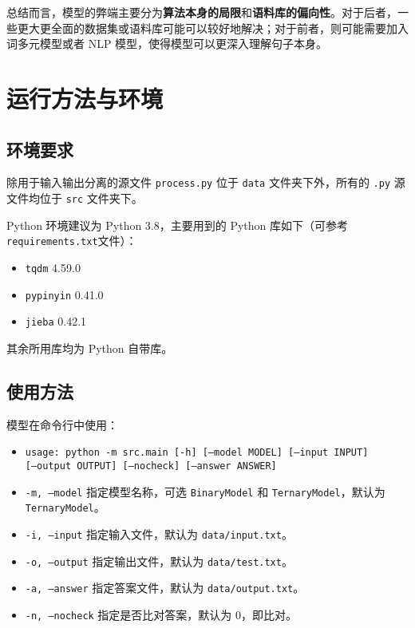 \documentclass[a4paper]{article}
\begin{document}
    总结而言，模型的弊端主要分为\textbf{算法本身的局限}和\textbf{语料库的偏向性}。对于后者，一些更大更全面的数据集或语料库可能可以较好地解决；对于前者，则可能需要加入词多元模型或者 NLP 模型，使得模型可以更深入理解句子本身。

    \section{运行方法与环境}

    \subsection{环境要求}

    除用于输入输出分离的源文件 \texttt{process.py} 位于 \texttt{data} 文件夹下外，所有的 \texttt{.py} 源文件均位于 \texttt{src} 文件夹下。
    
    Python 环境建议为 Python 3.8，主要用到的 Python 库如下（可参考\texttt{requirements.txt}文件）：
    \begin{itemize}
        \item \texttt{tqdm} 4.59.0
        \item \texttt{pypinyin} 0.41.0
        \item \texttt{jieba} 0.42.1
    \end{itemize}

    其余所用库均为 Python 自带库。

    \subsection{使用方法}

    模型在命令行中使用：

    \begin{itemize}
        \item \texttt{usage: python -m src.main [-h] [--model MODEL] [--input INPUT]} \\
        \texttt{[--output OUTPUT] [--nocheck] [--answer ANSWER]}
        \item \texttt{-m, --model} 指定模型名称，可选 \texttt{BinaryModel} 和 \texttt{TernaryModel}，默认为 \texttt{TernaryModel}。
        \item \texttt{-i, --input} 指定输入文件，默认为 \texttt{data/input.txt}。
        \item \texttt{-o, --output} 指定输出文件，默认为 \texttt{data/test.txt}。
        \item \texttt{-a, --answer} 指定答案文件，默认为 \texttt{data/output.txt}。
        \item \texttt{-n, --nocheck} 指定是否比对答案，默认为 $0$，即比对。
    \end{itemize}
\end{document}
